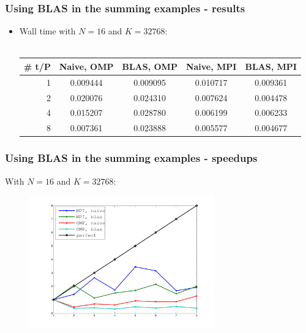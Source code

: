 \documentclass[ignorenonframetext]{beamer}
\begin{document}
\begin{frame}\frametitle{Using BLAS in the summing examples - results}
  \begin{itemize}
    \item Wall time with $N=16$ and $K=32768$: \\
      \ \\
      \begin{tabular}{r|c|c|c|c}
        \# t/P & Naive, OMP & BLAS, OMP & Naive, MPI & BLAS, MPI \\
        \hline
             1 & 0.009444 & 0.009095 & 0.010717 & 0.009361 \\
             2 & 0.020076 & 0.024310 & 0.007624 & 0.004478 \\
             4 & 0.015207 & 0.028780 & 0.006199 & 0.006233 \\
             8 & 0.007361 & 0.023888 & 0.005577 & 0.004677 
      \end{tabular}
  \end{itemize}
\end{frame}
\begin{frame}\frametitle{Using BLAS in the summing examples - speedups}
  With $N=16$ and $K=32768$:
  \begin{figure}[H]
    \begin{center}
      \includegraphics[width=8cm]{nospeedups}
    \end{center}
  \end{figure}
\end{frame}
\end{document}
